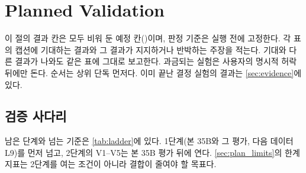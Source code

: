 \section{Planned Validation}
\label{sec:plan}

이 절의 결과 칸은 모두 비워 둔 예정 칸(\todoexp)이며, 판정 기준은 실행 전에 고정한다. 각 표의 캡션에 기대하는 결과와 그 결과가 지지하거나 반박하는 주장을 적는다. 기대와 다른 결과가 나와도 같은 표에 그대로 보고한다. 과금되는 실험은 사용자의 명시적 허락 뒤에만 돈다. 순서는 상위 단독 먼저다. 이미 끝난 결정 실험의 결과는 \cref{sec:evidence}에 있다.

\subsection{검증 사다리}
\label{sec:ladder}
남은 단계와 넘는 기준은 \cref{tab:ladder}에 있다. 1단계(본 35B와 그 평가, 다음 데이터 L9)를 먼저 넘고, 2단계의 V1--V5는 본 35B 평가 뒤에 연다. \cref{sec:plan_limits}의 한계 지표는 2단계를 여는 조건이 아니라 결합이 줄여야 할 목표다.
